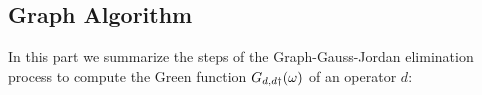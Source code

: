 


\subsection{Graph Algorithm \label{sec:Algorithm}}

In this part we summarize the steps of the Graph-Gauss-Jordan elimination process to compute the Green function  $G_{d,d\dagger}(\omega)$ of an operator $d$:


